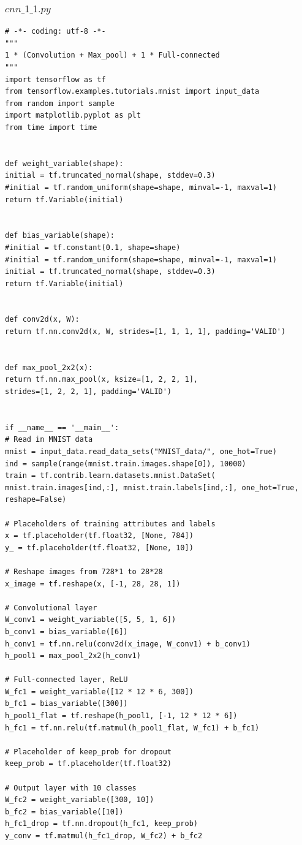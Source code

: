 \documentclass{article}
\begin{document}
\subsubsection{$cnn\_1\_1.py$}
\label{code-1}
\begin{lstlisting}
# -*- coding: utf-8 -*-
"""
1 * (Convolution + Max_pool) + 1 * Full-connected
"""
import tensorflow as tf
from tensorflow.examples.tutorials.mnist import input_data
from random import sample
import matplotlib.pyplot as plt
from time import time


def weight_variable(shape):
initial = tf.truncated_normal(shape, stddev=0.3)
#initial = tf.random_uniform(shape=shape, minval=-1, maxval=1)
return tf.Variable(initial)


def bias_variable(shape):
#initial = tf.constant(0.1, shape=shape)
#initial = tf.random_uniform(shape=shape, minval=-1, maxval=1)
initial = tf.truncated_normal(shape, stddev=0.3)
return tf.Variable(initial)


def conv2d(x, W):
return tf.nn.conv2d(x, W, strides=[1, 1, 1, 1], padding='VALID')


def max_pool_2x2(x):
return tf.nn.max_pool(x, ksize=[1, 2, 2, 1],
strides=[1, 2, 2, 1], padding='VALID')


if __name__ == '__main__':
# Read in MNIST data
mnist = input_data.read_data_sets("MNIST_data/", one_hot=True)
ind = sample(range(mnist.train.images.shape[0]), 10000)
train = tf.contrib.learn.datasets.mnist.DataSet(
mnist.train.images[ind,:], mnist.train.labels[ind,:], one_hot=True, reshape=False)

# Placeholders of training attributes and labels
x = tf.placeholder(tf.float32, [None, 784])
y_ = tf.placeholder(tf.float32, [None, 10])

# Reshape images from 728*1 to 28*28
x_image = tf.reshape(x, [-1, 28, 28, 1])

# Convolutional layer
W_conv1 = weight_variable([5, 5, 1, 6])
b_conv1 = bias_variable([6])
h_conv1 = tf.nn.relu(conv2d(x_image, W_conv1) + b_conv1)
h_pool1 = max_pool_2x2(h_conv1)

# Full-connected layer, ReLU
W_fc1 = weight_variable([12 * 12 * 6, 300])
b_fc1 = bias_variable([300])
h_pool1_flat = tf.reshape(h_pool1, [-1, 12 * 12 * 6])
h_fc1 = tf.nn.relu(tf.matmul(h_pool1_flat, W_fc1) + b_fc1)

# Placeholder of keep_prob for dropout
keep_prob = tf.placeholder(tf.float32)

# Output layer with 10 classes
W_fc2 = weight_variable([300, 10])
b_fc2 = bias_variable([10])
h_fc1_drop = tf.nn.dropout(h_fc1, keep_prob)
y_conv = tf.matmul(h_fc1_drop, W_fc2) + b_fc2


\end{lstlisting}
\end{document}

